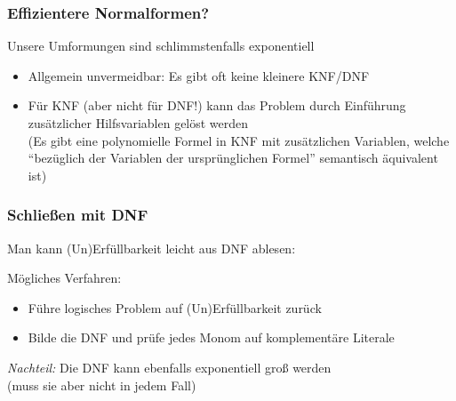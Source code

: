 \documentclass[aspectratio=1610,onlymath]{beamer}
\let\beameroriginaldoublebackslash\\
\let\\=\beameroriginaldoublebackslash
\begin{document}
\begin{frame}\frametitle{Effizientere Normalformen?}

Unsere Umformungen sind schlimmstenfalls exponentiell
\begin{itemize}
\item Allgemein unvermeidbar: Es gibt oft keine kleinere KNF/DNF
\item Für KNF (aber nicht für DNF!) kann das Problem durch Einführung zusätzlicher Hilfsvariablen gelöst werden\\[1ex]
{\tiny (Es gibt eine polynomielle Formel in KNF mit zusätzlichen Variablen, welche\\[-1.5ex] "`bezüglich der Variablen der ursprünglichen Formel"' semantisch äquivalent ist)}
\end{itemize}



\end{frame}

\begin{frame}[t]\frametitle{Schließen mit DNF}

Man kann (Un)Erfüllbarkeit leicht aus DNF ablesen:\medskip


Mögliches Verfahren:
\begin{itemize}
\item Führe logisches Problem auf (Un)Erfüllbarkeit zurück
\item Bilde die DNF und prüfe jedes Monom auf komplementäre Literale
\end{itemize}
\emph{Nachteil:} Die DNF kann ebenfalls exponentiell groß werden\\ (muss sie aber nicht in jedem Fall)

\end{frame}
\end{document}
